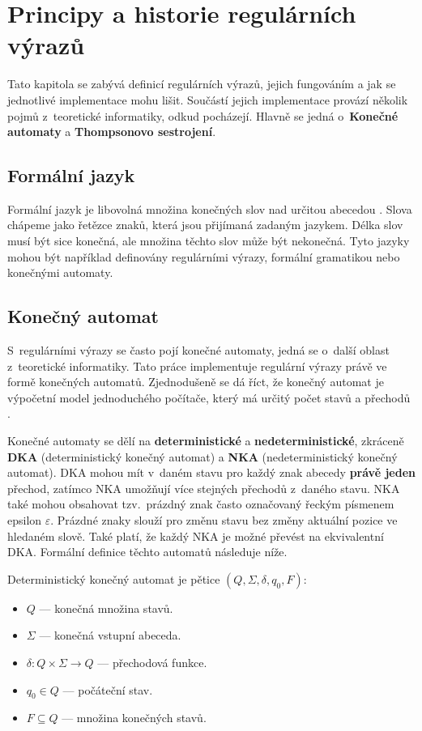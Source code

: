 \chapter{Principy a historie regulárních výrazů}\label{sec:Principle}

Tato kapitola se zabývá definicí regulárních výrazů, jejich fungováním a jak se jednotlivé implementace mohu lišit. 
Součástí jejich implementace provází několik pojmů z~teoretické informatiky, odkud pocházejí.
Hlavně se jedná o~\textbf{Konečné automaty} a \textbf{Thompsonovo sestrojení}.

\section{Formální jazyk}
Formální jazyk je libovolná množina konečných slov nad určitou abecedou \cite{MUNIFL}. 
Slova chápeme jako řetězce znaků, která jsou přijímaná zadaným jazykem.
Délka slov musí být sice konečná, ale množina těchto slov může být nekonečná. 
Tyto jazyky mohou být například definovány regulárními výrazy, formální gramatikou nebo konečnými automaty. 

\section{Konečný automat}\label{sec:FiniteAutomaton}
S~regulárními výrazy se často pojí konečné automaty, jedná se o~další oblast z~teoretické informatiky.
Tato práce implementuje regulární výrazy právě ve formě konečných automatů.
Zjednodušeně se dá říct, že konečný automat je výpočetní model jednoduchého počítače, který má určitý počet stavů a přechodů \cite{Havrlant}. 

Konečné automaty se dělí na \textbf{deterministické} a \textbf{nedeterministické}, zkráceně \textbf{DKA} (deterministický konečný automat) a \textbf{NKA} (nedeterministický konečný automat).
DKA mohou mít v~daném stavu pro každý znak abecedy \textbf{právě jeden} přechod, zatímco NKA umožňují více stejných přechodů z~daného stavu. 
NKA také mohou obsahovat tzv.\ prázdný znak často označovaný řeckým písmenem epsilon $\varepsilon$. 
Prázdné znaky slouží pro změnu stavu bez změny aktuální pozice ve hledaném slově. 
Také platí, že každý NKA je možné převést na ekvivalentní DKA.
Formální definice těchto automatů následuje níže.

\newpage

\noindent Deterministický konečný automat je pětice $(Q, \Sigma, \delta, q_0, F)$\cite{Viswanathan_2017}:
\begin{itemize}
	\item $Q$ --- konečná množina stavů.
	\item $\Sigma$ --- konečná vstupní abeceda.
	\item $\delta: Q \times \Sigma \rightarrow Q$ --- přechodová funkce.
	\item $q_0 \in Q$ --- počáteční stav.
	\item $F \subseteq Q$ --- množina konečných stavů.
\end{itemize}

